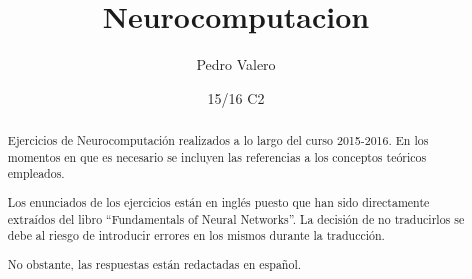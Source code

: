 \documentclass[nochap,palatino]{apuntes}
\title{Neurocomputacion}
\author{Pedro Valero}
\date{15/16 C2}
\begin{document}
\pagestyle{plain}

\begin{abstract}
Ejercicios de Neurocomputación realizados a lo largo del curso 2015-2016. En los momentos en que es necesario se incluyen las referencias a los conceptos teóricos empleados.

Los enunciados de los ejercicios están en inglés puesto que han sido directamente extraídos del libro ``Fundamentals of Neural Networks''. La decisión de no traducirlos se debe al riesgo de introducir errores en los mismos durante la traducción.

No obstante, las respuestas están redactadas en español.
\end{abstract}

\maketitle

\tableofcontents
\newpage


\printindex
\end{document}
